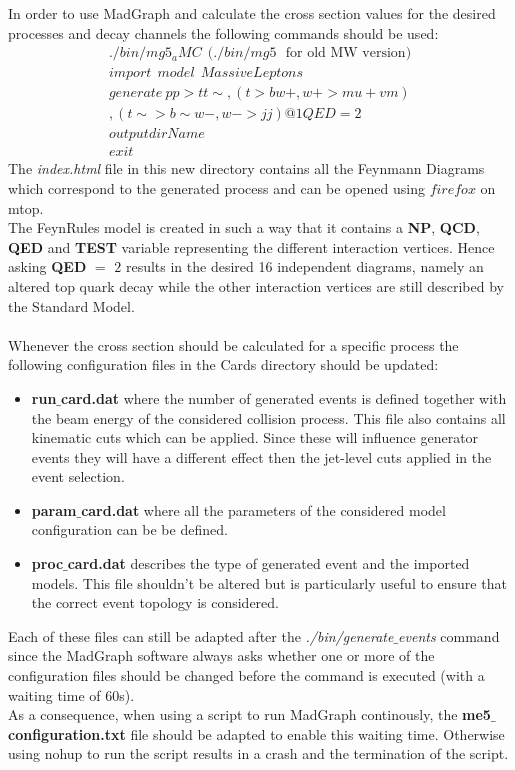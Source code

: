 In order to use MadGraph and calculate the cross section values for the desired processes and decay channels the following commands should be used:
\begin{eqnarray}
 ./bin/mg5_aMC ~~ (./bin/mg5 ~~~ \textrm{for old MW version)}\\
 import ~~ model ~~ MassiveLeptons \\
  generate ~ p p > t t\sim , ( t > b w+ , w+ > mu+ vm ) \nonumber \\
  , ( t\sim > b\sim w- , w- > j j ) @1 QED = 2 \\
 output dirName \\
 exit
\end{eqnarray}
The \textit{index.html} file in this new directory contains all the Feynmann Diagrams which correspond to the generated process and can be opened using $firefox$ on mtop.\\
The FeynRules model is created in such a way that it contains a \textbf{NP}, \textbf{QCD}, \textbf{QED} and \textbf{TEST} variable representing the different interaction vertices. Hence asking \textbf{QED} $=$ $2$ results in the desired 16 independent diagrams, namely an altered top quark decay while the other interaction vertices are still described by the Standard Model.\\
\\
Whenever the cross section should be calculated for a specific process the following configuration files in the Cards directory should be updated:
\begin{itemize}
 \item \textbf{run$\_$card.dat} where the number of generated events is defined together with the beam energy of the considered collision process. This file also contains all kinematic cuts which can be applied. Since these will influence generator events they will have a different effect then the jet-level cuts applied in the event selection.
 \item \textbf{param$\_$card.dat} where all the parameters of the considered model configuration can be be defined.
 \item \textbf{proc$\_$card.dat} describes the type of generated event and the imported models. This file shouldn't be altered but is particularly useful to ensure that the correct event topology is considered.
\end{itemize}
Each of these files can still be adapted after the \textit{./bin/generate$\_$events} command since the MadGraph software always asks whether one or more of the configuration files should be changed before the command is executed (with a waiting time of 60s).\\
As a consequence, when using a script to run MadGraph continously, the \textbf{me5$\_$configuration.txt} file should be adapted to enable this waiting time. Otherwise using nohup to run the script results in a crash and the termination of the script.


